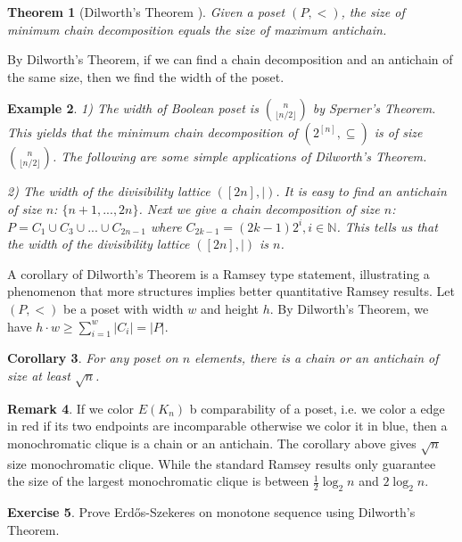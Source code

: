 \documentclass{article}
\newtheorem{theorem}{Theorem}[section]
\newtheorem{corollary}[theorem]{Corollary}
\newtheorem{example}[theorem]{Example}
\theoremstyle{definition}
\newtheorem{remark}[theorem]{Remark}
\newtheorem{exercise}[theorem]{Exercise}
\def\Erdos{Erd\H{o}s}
\begin{document}
\begin{theorem}[Dilworth's Theorem \cite{dilworth1950decompo}]\label{thm:Dilworth}
    Given a poset $(P,<)$, the size of minimum chain decomposition equals the size of maximum antichain. 
\end{theorem}

By Dilworth's Theorem, if we can find a chain decomposition and an antichain of the same size, then we find the width of the poset. 

\begin{example}
    1) The width of Boolean poset is $\binom{n}{\lfloor n/2 \rfloor}$ by Sperner's Theorem. This yields that the minimum chain decomposition of $(2^{[n]}, \subseteq)$ is of size $\binom{n}{\lfloor n/2 \rfloor}$. The following are some simple applications of Dilworth's Theorem.

    2) The width of the divisibility lattice $([2n], |)$. It is easy to find an antichain of size $n$: $\{n+1,...,2n\}$. Next we give a chain decomposition of size $n$: $P = C_1 \cup C_3 \cup ... \cup C_{2n-1}$ where $C_{2k-1} = (2k-1)2^i, i \in \mathbb{N}$. This tells us that the width of the divisibility lattice $([2n], |)$ is $n$.
\end{example}

A corollary of Dilworth's Theorem is a Ramsey type statement, illustrating a phenomenon that more structures implies better quantitative Ramsey results. Let $(P,<)$ be a poset with width $w$ and height $h$. By Dilworth's Theorem, we have $h \cdot w \geq \sum_{i=1}^w |C_i| = |P|$.

\begin{corollary}
    For any poset on $n$ elements, there is a chain or an antichain of size at least $\sqrt{n}$.
\end{corollary}

\begin{remark}
    If we color $E(K_n)$ b comparability of a poset, i.e. we color a edge in red if its two endpoints are incomparable otherwise we color it in blue, then a monochromatic clique is a chain or an antichain. The corollary above gives $\sqrt{n}$ size monochromatic clique. While the standard Ramsey results only guarantee the size of the largest monochromatic clique is between $\frac{1}{2}\log_2 n$ and $2\log_2 n$.
\end{remark}

\begin{exercise}
    Prove \Erdos{}-Szekeres on monotone sequence using Dilworth's Theorem.
\end{exercise}
\end{document}
